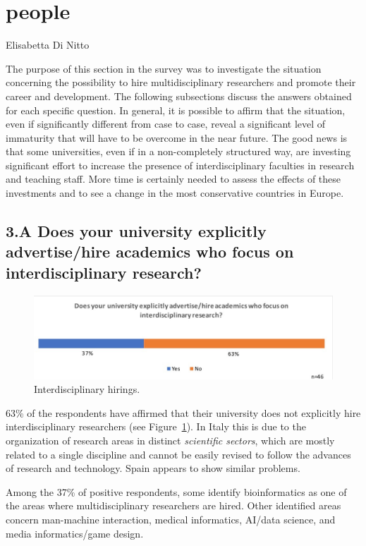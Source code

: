 \section{people}

Elisabetta Di Nitto

The purpose of this section in the survey was to investigate the
situation concerning the possibility to hire multidisciplinary
researchers and promote their career and development. The 
following subsections discuss the answers obtained for each specific
question. In general, it is possible to affirm that the situation,
even if significantly different from case to case, reveal a
significant level of immaturity that will have to be overcome in the
near future. The good news is that some universities, even if in
a non-completely structured way, are investing significant effort to
increase the presence of interdisciplinary faculties in research and
teaching staff. More time is certainly needed to assess the
effects of these investments and to see a change in the most
conservative countries in Europe. 

\subsection{3.A Does your university explicitly advertise/hire academics
  who focus on interdisciplinary research?}\label{sec:hiring}

\begin{figure}\label{sect3:hirings}
\centering
\includegraphics[width = \linewidth]{charts/3a.jpg}
\caption{Interdisciplinary hirings.}
\end{figure}

63\% of the respondents have affirmed that their university does not
explicitly hire interdisciplinary researchers (see Figure~\ref{sect3:hirings}). In Italy this is 
due to the organization of research areas in distinct \emph{scientific
  sectors}, which are mostly related to a single discipline and cannot be easily revised to follow the advances of
research and technology. Spain appears to show similar problems.

Among the 37\% of positive respondents, some identify bioinformatics
as one of the areas where multidisciplinary researchers are hired. 
Other identified areas concern man-machine interaction, medical
informatics, AI/data science, and media informatics/game design.

